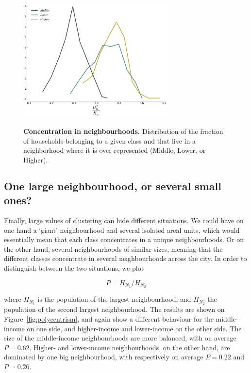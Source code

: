 \begin{figure} 
    \centering
    \includegraphics[width=0.7\textwidth]{gfx/chapter-segregation/neighbourhoods_content.pdf}\\
    \caption{{\bf Concentration in neighbourhoods.} Distribution of the fraction of households belonging to a
      given class and that live in a neighborhood where it is
      over-represented (Middle, Lower, or Higher).} 
        \label{fig:content} 
\end{figure}



\subsection{One large neighbourhood, or several small ones?}
\label{sub:one_large_neighbourhood_or_several_small_ones_}

Finally, large values of clustering can hide different situations. We
could have on one hand a `giant' neighbourhood and several isolated areal units, which
would essentially mean that each class concentrates in a unique
neighbourhoods. Or on the other hand, several neighbourhoods of
similar sizes, meaning that the different classes concentrate in
several neighbourhoods across the city. In order to distinguish
between the two situations, we plot

\begin{equation} 
    P = H_{N_1} / H_{N_2} 
\end{equation}

where $H_{N_1}$ is the population of the largest neighbourhood, and $H_{N_2}$
the population of the second largest neighbourhood. The results are shown on
Figure~\ref{fig:polycentrism}, and again show a different behaviour for the
middle-income on one side, and higher-income and lower-income on the other side.
The size of the middle-income neighbourhoods are more balanced, with on average
$P=0.62$.  Higher- and lower-income neighbourhoods, on the other hand, are
dominated by one big neighbourhood, with respectively on average $P=0.22$ and
$P=0.26$.


